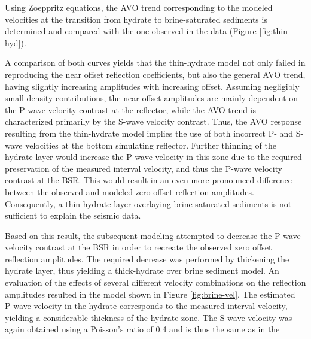 
Using Zoeppritz equations, the AVO trend corresponding to the modeled 
velocities at the transition from hydrate to brine-saturated sediments is 
determined and compared with the one observed in the data 
(Figure \ref{fig:thin-hyd}).


A comparison of both curves yields that the thin-hydrate model not only failed
in reproducing the near offset reflection coefficients, but also the general 
AVO trend, having slightly increasing amplitudes with increasing offset.
Assuming negligibly small density contributions, the near offset amplitudes
are mainly dependent on the P-wave velocity contrast at the reflector, 
while the AVO trend is 
characterized primarily by the S-wave velocity contrast.
Thus, the AVO response resulting from the thin-hydrate model implies the use
of both incorrect P- and S-wave velocities at the bottom simulating reflector.
Further thinning of the hydrate layer would increase the P-wave
velocity in this zone due to the required preservation of the measured 
interval velocity, and thus the P-wave velocity contrast at the BSR.
This would result in an even more pronounced difference between the observed 
and modeled zero offset reflection amplitudes. Consequently, a thin-hydrate
layer overlaying brine-saturated sediments is not sufficient to explain
the seismic data.
\par
Based on this result, the subsequent modeling attempted to decrease the 
P-wave velocity contrast at the BSR in order to recreate the observed zero 
offset reflection amplitudes. The required decrease was performed by thickening
the hydrate layer, thus yielding a thick-hydrate over brine sediment model. 
An evaluation of the effects of several different velocity combinations on
the reflection amplitudes resulted in the model shown in Figure \ref{fig:brine-vel}.
The estimated P-wave velocity in the hydrate 
corresponds to the measured interval velocity,
yielding a considerable thickness of the hydrate zone. The S-wave velocity was
again obtained using a Poisson's ratio of 0.4 and is thus the same as in the 
